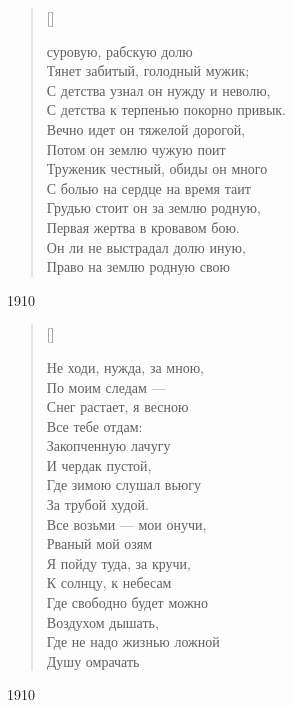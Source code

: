 \settowidth{\versewidth}{С детства к терпенью покорно привык.}
\begin{verse}[\versewidth]
\begin{patverse*}
 суровую, рабскую долю\\
Тянет забитый, голодный мужик;\\
 С детства узнал он нужду и неволю,\\
С детства к терпенью покорно привык.\\
 Вечно идет он тяжелой дорогой,\\
Потом он землю чужую поит\ldotst\\
 Труженик честный, обиды он много\\
С болью на сердце на время таит\ldotst\\
 Грудью стоит он за землю родную, \\
Первая жертва в кровавом бою.\\
 Он ли не выстрадал долю иную,\\
Право на землю родную свою\ldotsq
\end{patverse*}
\end{verse}
1910


\settowidth{\versewidth}{Где не надо жизнью ложной}
\begin{verse}[\versewidth]
\begin{altverse}
Не ходи, нужда, за мною,\\
    По моим следам ---\\
Снег растает, я весною\\
    Все тебе отдам:\\
Закопченную лачугу\\
    И чердак пустой,\\
Где зимою слушал вьюгу\\
    За трубой худой.\\
Все возьми --- мои онучи,\\
    Рваный мой озям\ldotst\\
Я пойду туда, за кручи,\\
    К солнцу, к небесам\ldotst\\
Где свободно будет можно\\
    Воздухом дышать,\\
Где не надо жизнью ложной\\
    Душу омрачать\ldotst\\
\end{altverse}
\end{verse}
1910

